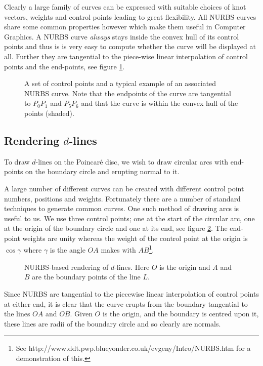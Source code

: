 Clearly a large family of curves can be expressed with suitable choices
of knot vectors, weights and control points leading to great flexibility.
All NURBS curves share some common properties however which make them
useful in Computer Graphics. A NURBS curve \emph{always} stays inside the
convex hull of its control points \cite{rogers} and thus is is very easy
to compute whether the curve will be displayed at all. Further they
are tangential to the piece-wise linear interpolation of control
points and the end-points, see figure \ref{fig:samplenurb}.

\begin{figure} \centering
{}
\caption{A set of control points and a typical example of an associated
NURBS curve. Note that the endpoints of the curve are tangential to
$P_0P_1$ and $P_5P_6$ and that the curve is within the convex hull
of the points (shaded).}
\label{fig:samplenurb}
\end{figure}

\subsection{Rendering $d$-lines}

To draw $d$-lines on the Poincar\'e disc, we wish to draw circular arcs
with end-points on the boundary circle and erupting normal to it.

A large number of different curves can be created with different control 
point numbers, positions and weights. Fortunately there are a number of
standard techniques to generate common curves. One such method of
drawing arcs is useful to us. We use three control
points; one at the start of the circular arc, one at the origin of the
boundary circle and one
at its end, see figure \ref{fig:nurbs}. 
The end-point weights are unity whereas the weight of the control
point at the origin is $\cos \gamma$ where $\gamma$ is the angle
$OA$ makes with $AB$\footnote{See http://www.ddt.pwp.blueyonder.co.uk/evgeny/Intro/NURBS.htm for a demonstration of this.}. 

\begin{figure} \centering
{}
\caption{NURBS-based rendering of $d$-lines. Here $O$ is the origin and
$A$ and $B$ are the boundary points of the line $L$.}
\label{fig:nurbs}
\end{figure}

Since NURBS are tangential to the piecewise linear interpolation of control 
points
at either end, it is clear that the curve erupts from the boundary
tangential to the lines $OA$ and $OB$. Given $O$ is the origin, and the
boundary is centred upon it, these lines are radii of the boundary
circle and so clearly are normals.

